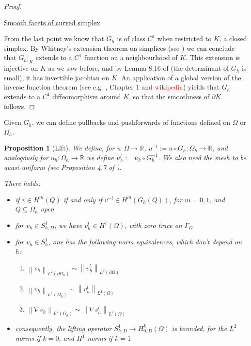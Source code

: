 \documentclass[english,a4paper,10pt,oneside]{scrbook}	%
\theoremstyle{break}
\newtheorem{prop}[equation]{Proposition}
\newenvironment{mproof}[1][\proofname]{%
  \begin{proof}[#1]$ $\par\nobreak\ignorespaces
}{%
  \end{proof}
}
\renewcommand*{\proofname}{Proof}
\theoremstyle{remark}
\newcommand{\mR}{\mathbb{R}}
\newcommand{\norm}[1]{\left\lVert#1\right\rVert}
\begin{document}
\begin{mproof}
\underline{Smooth facets of curved simplex}

From the last point we know that $G_h$ is of class $C^1$ when restricted to $K$, a closed simplex. By Whitney's extension theorem on simplices (see \cite{whitney}) we can conclude that $G_h|_K$ extends to a $C^1$ function on a neighbourhood of $K$. This extension is injective on $K$ as we saw before, and by Lemma 8.16 of \cite{ranner} (the determinant of $G_h$ is small), it has invertible jacobian on $K$. An application of a global version of the inverse function theorem (see e.g. \cite{pollack}, Chapter 1 \textcolor{red}{and wikipedia}) yields that $G_h$ extends to a $C^1$ diffeomorphism around $K$, so that the smoothness of $\partial K$ follows.

\end{mproof}

Given $G_h$, we can define pullbacks and pushforwards of functions defined on $\Omega$ or $\Omega_h$.


\begin{prop}[Lift]
\label{prop:lift}
We define, for $u: \Omega \rightarrow \mR$, $u^{-l}:=u\circ G_h : \Omega_h \rightarrow \mR$, and analogously for $u_h: \Omega_h \rightarrow \mR$ we define $u_h^l:=u_h\circ G_h^{-1}$. We also need the mesh to be quasi-uniform (see Proposition 4.7 of \cite{elliott}).

There holds:

\begin{itemize}
	\item if $v\in H^m(Q)$ if and only if $v^{-l} \in H^m(G_h(Q))$, for $m=0,1$, and $Q\subseteq \Omega_h$ open
	\item for $v_h \in S^1_{h,D}$, we have $v_h^l \in H^1(\Omega)$, with zero trace on $\Gamma_D$ 
	\item for $v_h  \in S^1_h$, one has the following norm equivalences, which don't depend on $h$:
	\begin{enumerate}
		\item $\norm{v_h}_{L^2(\partial \Omega_h)} \sim \norm{v_h^l}_{L^2(\partial \Omega)}$
		\item $\norm{v_h}_{L^2( \Omega_h)} \sim \norm{v_h^l}_{L^2( \Omega)}$
		\item $\norm{\nabla v_h}_{L^2( \Omega_h)} \sim \norm{\nabla v_h^l}_{L^2( \Omega)}$
	\end{enumerate}
	\item consequently, the lifting operator $S^{1}_{h,D}\rightarrow H^k_{0,D}(\Omega)$ is bounded, for the $L^2$ norms if $k=0$, and $H^1$ norms if $k=1$ 
	
\end{itemize}

\end{prop}
\end{document}
